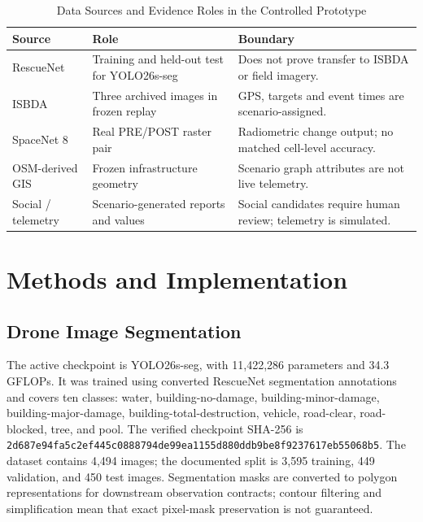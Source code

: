 \documentclass[conference]{IEEEtran}
\newcommand{\changed}[1]{{\color{blue}#1}}
\newcommand{\changed}[1]{#1}
\begin{document}
\begin{table}[t]
\caption{Data Sources and Evidence Roles in the Controlled Prototype}
\label{tab:provenance}
\centering
\footnotesize
\begin{tabular}{@{}p{}p{}p{}@{}}
\toprule
\textbf{Source} & \textbf{Role} & \textbf{Boundary}\\
\midrule
RescueNet & Training and held-out test for YOLO26s-seg & Does not prove transfer to ISBDA or field imagery.\\
ISBDA & Three archived images in frozen replay & GPS, targets and event times are scenario-assigned.\\
SpaceNet 8 & Real PRE/POST raster pair & Radiometric change output; no matched cell-level accuracy.\\
OSM-derived GIS & Frozen infrastructure geometry & Scenario graph attributes are not live telemetry.\\
Social / telemetry & Scenario-generated reports and values & Social candidates require human review; telemetry is simulated.\\
\bottomrule
\end{tabular}
\end{table}

\section{Methods and Implementation}
\subsection{Drone Image Segmentation}
The active checkpoint is YOLO26s-seg, with 11,422,286 parameters and 34.3 GFLOPs. It was trained using converted RescueNet segmentation annotations and covers ten classes: water, building-no-damage, building-minor-damage, building-major-damage, building-total-destruction, vehicle, road-clear, road-blocked, tree, and pool. The verified checkpoint SHA-256 is \changed{\texttt{2d687e94fa5c2ef4}\allowbreak\texttt{45c0888794de99ea}\allowbreak\texttt{1155d880ddb9be8f}\allowbreak\texttt{9237617eb55068b5}}. The dataset contains 4,494 images; the documented split is 3,595 training, 449 validation, and 450 test images. Segmentation masks are converted to polygon representations for downstream observation contracts; contour filtering and simplification mean that exact pixel-mask preservation is not guaranteed.
\end{document}

